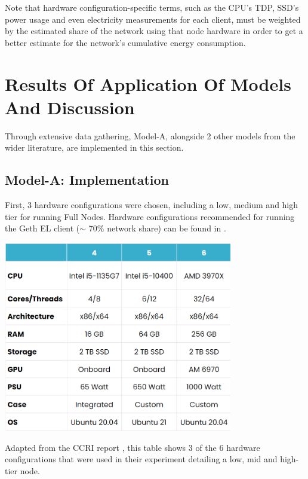 Note that hardware configuration-specific terms, such as the CPU's TDP, SSD's power usage and even electricity measurements for each client, must be weighted by the estimated share of the network using that node hardware in order to get a better estimate for the network's cumulative energy consumption. 


\section{Results Of Application Of Models And Discussion}
\label{ImplementationSection}
Through extensive data gathering, Model-A, alongside 2 other models from the wider literature, are implemented in this section.


\subsection{Model-A: Implementation}

First, 3 hardware configurations were chosen, including a low, medium and high tier for running Full Nodes. Hardware configurations recommended for running the Geth EL client ($\sim$ 70\% network share) can be found in .

\begin{table}[htb!]
    \centering
    \includegraphics[width=10cm,center]{Figures/CCRIhardwareConfigEdit.png}
    \caption{Adapted from the CCRI report \cite{CryptoCarbonRatingsInstitute2022TheNetwork}, this table shows 3 of the 6 hardware configurations that were used in their experiment detailing a low, mid and high-tier node.}
    \label{Table:CCRIhardwareConfig}
\end{table}

